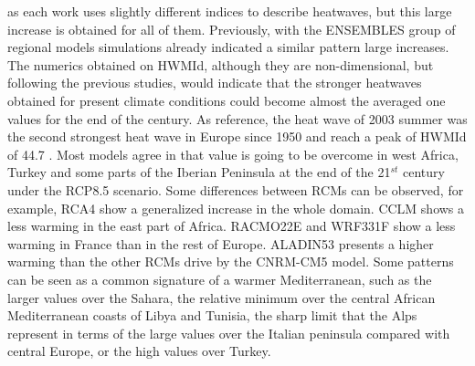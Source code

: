 as each work uses slightly different indices to describe heatwaves, but this large
increase is obtained for all of them. Previously, with the ENSEMBLES 
group of regional models simulations \cite{fis_sch2010} already indicated a similar 
pattern large increases. 
The numerics obtained on HWMId, although they are non-dimensional, but following the previous studies, would indicate that the stronger heatwaves obtained for present climate conditions could become almost the averaged one values for the end of the century. 
As reference, the heat wave of 2003 summer was the second strongest heat wave in Europe since 1950 \cite{bar_al2011} and reach a peak of HWMId of 44.7 \cite{rus_al2015}. Most models agree in that value is going to be overcome in west Africa,  Turkey and some parts of the Iberian Peninsula at the end of the 21$^{st}$ century under the RCP8.5 scenario. 
Some differences between RCMs can be observed, for example, RCA4 show a generalized increase in the whole domain. CCLM shows a less warming in the east part of Africa. RACMO22E and WRF331F show a less warming in France than in the rest of Europe. ALADIN53 presents a higher warming than the other RCMs drive by the CNRM-CM5 model. 
Some patterns can be seen as a common signature of a warmer Mediterranean,
such as the larger values over the Sahara, the relative minimum over the central
African Mediterranean coasts of Libya and Tunisia, the sharp limit that the Alps represent in terms of the large values over the Italian peninsula compared with central Europe, or the high values over Turkey. 


